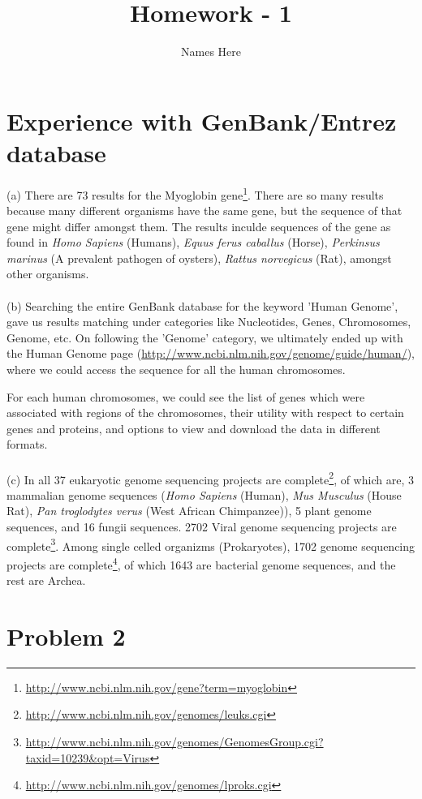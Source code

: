 \documentclass{article}
\title{Homework - 1}
\author{Names Here}
\begin{document}
\maketitle

\clearpage


\section{Experience with GenBank/Entrez database}
(a) There are 73 results for the Myoglobin gene\footnote{\url{http://www.ncbi.nlm.nih.gov/gene?term=myoglobin}}. There are so many results because many different organisms have the same gene, but the sequence of that gene might differ amongst them.
The results inculde sequences of the gene as found in \textit{Homo Sapiens} (Humans), \textit{Equus ferus caballus} (Horse), \textit{Perkinsus marinus} (A prevalent pathogen of oysters), \textit{Rattus norvegicus} (Rat), amongst other organisms.\\
\\
(b) Searching the entire GenBank database for the keyword 'Human Genome', gave us results matching under categories like Nucleotides, Genes, Chromosomes, Genome, etc. On following the 'Genome' category, we ultimately ended up with the Human Genome page (\url{http://www.ncbi.nlm.nih.gov/genome/guide/human/}), where we could access the sequence for all the human chromosomes. 

For each human chromosomes, we could see the list of genes which were associated with regions of the chromosomes, their utility with respect to certain genes and proteins, and options to view and download the data in different formats.\\
\\
(c) In all 37 eukaryotic genome sequencing projects are complete\footnote{\url{http://www.ncbi.nlm.nih.gov/genomes/leuks.cgi}}, of which are, 3 mammalian genome sequences (\textit{Homo Sapiens} (Human), \textit{Mus Musculus} (House Rat), \textit{Pan troglodytes verus} (West African Chimpanzee)), 5 plant genome sequences, and 16 fungii sequences. 2702 Viral genome sequencing projects are complete\footnote{\url{http://www.ncbi.nlm.nih.gov/genomes/GenomesGroup.cgi?taxid=10239&opt=Virus}}. Among single celled organizms (Prokaryotes), 1702 genome sequencing projects are complete\footnote{\url{http://www.ncbi.nlm.nih.gov/genomes/lproks.cgi}}, of which 1643 are bacterial genome sequences, and the rest are Archea. 
\clearpage

\section{Problem 2}
\clearpage
\end{document}
